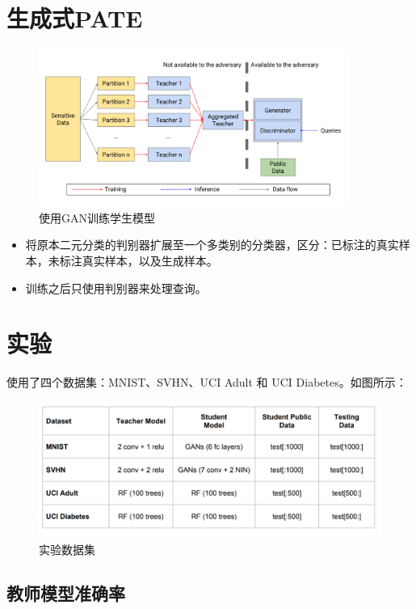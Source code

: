 \documentclass[a4paper]{article}
\begin{document}
\section{生成式PATE}

\begin{figure}[!ht]
\includegraphics[width = 4in]{fig/student-model-gan.png}
\caption{使用GAN训练学生模型}
\end{figure}
\begin{itemize}
\item 将原本二元分类的判别器扩展至一个多类别的分类器，区分：已标注的真实样本，未标注真实样本，以及生成样本。
\item 训练之后只使用判别器来处理查询。
\end{itemize}


\section{实验}

使用了四个数据集：MNIST、SVHN、UCI Adult 和 UCI Diabetes。如图所示：
\begin{figure}[!ht]
\includegraphics[width = \linewidth]{fig/experiment-settings.png}
\caption{实验数据集}
\end{figure}


\subsection{教师模型准确率}
\end{document}
